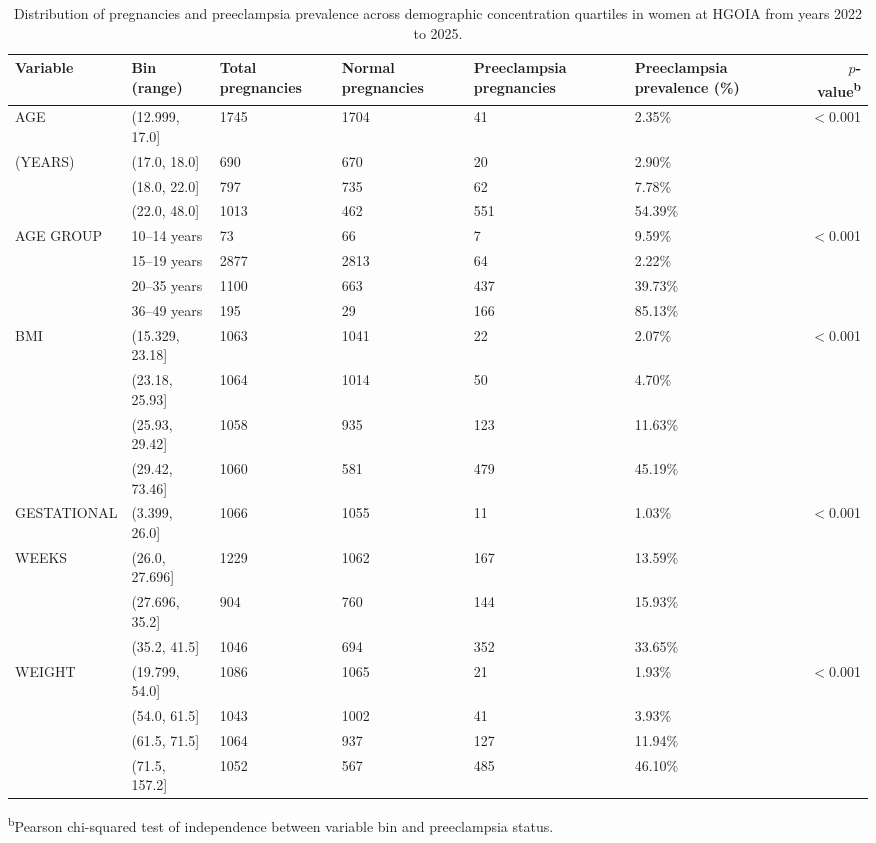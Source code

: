 \documentclass[diagnostics,article,submit,pdftex,moreauthors]{Definitions/mdpi}
\begin{document}
\begin{table}[H]
  \small
\centering
\caption{Distribution of pregnancies and preeclampsia prevalence
  across demographic concentration quartiles in women at \ac{HGOIA}
  from years 2022 to 2025.}
\begin{tabularx}{\textwidth}{llXXp{}Xr}
\toprule
Variable & Bin (range) & Total pregnancies & Normal pregnancies & Preeclampsia pregnancies & Preeclampsia prevalence (\%) & $p$-value\textsuperscript{b} \\
\midrule
AGE         & (12.999, 17.0] & 1745 & 1704 & 41 & 2.35\% & \multirow{4}{*}{$<$0.001} \\
(YEARS)     & (17.0, 18.0]   & 690  & 670  & 20  & 2.90\% &  \\
            & (18.0, 22.0]   & 797  & 735  & 62  & 7.78\% &  \\
            & (22.0, 48.0]   & 1013 & 462  & 551 & 54.39\% &  \\
\midrule
AGE GROUP   & 10–14 years    & 73   & 66   & 7   & 9.59\% & \multirow{4}{*}{$<$0.001} \\
            & 15–19 years    & 2877 & 2813 & 64  & 2.22\% &  \\
            & 20–35 years    & 1100 & 663  & 437 & 39.73\% &  \\
            & 36–49 years    & 195  & 29   & 166 & 85.13\% &  \\
\midrule
BMI         & (15.329, 23.18] & 1063 & 1041 & 22  & 2.07\% & \multirow{4}{*}{$<$0.001} \\
            & (23.18, 25.93]  & 1064 & 1014 & 50  & 4.70\% &  \\
            & (25.93, 29.42]  & 1058 & 935  & 123 & 11.63\% &  \\
            & (29.42, 73.46]  & 1060 & 581  & 479 & 45.19\% &  \\
\midrule
GESTATIONAL & (3.399, 26.0]   & 1066 & 1055 & 11  & 1.03\% & \multirow{4}{*}{$<$0.001} \\
WEEKS       & (26.0, 27.696]  & 1229 & 1062 & 167 & 13.59\% &  \\
            & (27.696, 35.2]  & 904  & 760  & 144 & 15.93\% &  \\
            & (35.2, 41.5]    & 1046 & 694  & 352 & 33.65\% &  \\
\midrule
WEIGHT      & (19.799, 54.0]  & 1086 & 1065 & 21  & 1.93\% & \multirow{4}{*}{$<$0.001} \\
            & (54.0, 61.5]    & 1043 & 1002 & 41  & 3.93\% &  \\
            & (61.5, 71.5]    & 1064 & 937  & 127 & 11.94\% &  \\
            & (71.5, 157.2]   & 1052 & 567  & 485 & 46.10\% &  \\
\bottomrule
\end{tabularx}
\noindent\footnotesize{\textsuperscript{b}Pearson chi-squared test of independence between variable bin and preeclampsia status.}
\label{tab:variable_distribution}
\end{table}
\end{document}
